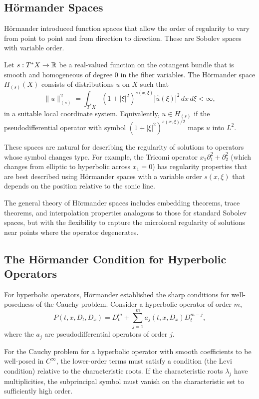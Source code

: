 \subsection{H\"ormander Spaces}

H\"ormander introduced function spaces that allow the order of
regularity to vary from point to point and from direction to direction.
These are Sobolev spaces with variable order.

\begin{definition}
Let \(s : T^*X \to \mathbb{R}\) be a real-valued function on the cotangent
bundle that is smooth and homogeneous of degree 0 in the fiber
variables. The H\"ormander space \(H_{(s)}(X)\) consists of
distributions \(u\) on \(X\) such that
\[
\|u\|_{(s)}^2 = \int_{T^*X} (1+|\xi|^2)^{s(x,\xi)} |\hat u(\xi)|^2
\,dx\,d\xi < \infty,
\]
in a suitable local coordinate system. Equivalently,
\(u \in H_{(s)}\) if the pseudodifferential operator with symbol
\((1+|\xi|^2)^{s(x,\xi)/2}\) maps \(u\) into \(L^2\).
\end{definition}

These spaces are natural for describing the regularity of solutions to
operators whose symbol changes type. For example, the Tricomi operator
\(x_1 \partial_1^2 + \partial_2^2\) (which changes from elliptic to
hyperbolic across \(x_1 = 0\)) has regularity properties that are best
described using H\"ormander spaces with a variable order \(s(x,\xi)\)
that depends on the position relative to the sonic line.

The general theory of H\"ormander spaces includes embedding theorems,
trace theorems, and interpolation properties analogous to those for
standard Sobolev spaces, but with the flexibility to capture the
microlocal regularity of solutions near points where the operator
degenerates.

\subsection{The H\"ormander Condition for Hyperbolic Operators}

For hyperbolic operators, H\"ormander established the sharp conditions
for well-posedness of the Cauchy problem. Consider a hyperbolic operator
of order \(m\),
\[
P(t,x, D_t, D_x) = D_t^m + \sum_{j=1}^m a_j(t,x,D_x) D_t^{m-j},
\]
where the \(a_j\) are pseudodifferential operators of order \(j\).

\begin{condition}
For the Cauchy problem for a hyperbolic operator with smooth
coefficients to be well-posed in \(C^\infty\), the lower-order terms
must satisfy a condition (the Levi condition) relative to the
characteristic roots. If the characteristic roots \(\lambda_j\) have
multiplicities, the subprincipal symbol must vanish on the
characteristic set to sufficiently high order.
\end{condition}

